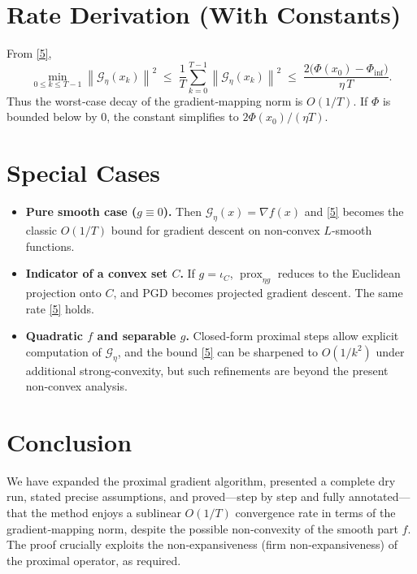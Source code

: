 \documentclass{article}
\newcommand{\prox}{\operatorname{prox}}
\newcommand{\norm}[1]{\left\|#1\right\|}
\newcommand{\grad}{\nabla}
\newcommand{\G}{\mathcal{G}}
\begin{document}
\section*{Rate Derivation (With Constants)}
From \eqref{5},
\[
\min_{0\le k\le T-1}\norm{\G_{\eta}(x_{k})}^{2}
\;\le\;
\frac{1}{T}\sum_{k=0}^{T-1}\norm{\G_{\eta}(x_{k})}^{2}
\;\le\;
\frac{2\big(\Phi(x_{0})-\Phi_{\inf}\big)}{\eta\,T}.
\]
Thus the worst‑case decay of the gradient‑mapping norm is $O(1/T)$.
If $\Phi$ is bounded below by $0$, the constant simplifies to $2\Phi(x_{0})/(\eta T)$.

\section*{Special Cases}
\begin{itemize}
\item \textbf{Pure smooth case ($g\equiv0$).} Then $\G_{\eta}(x)=\grad f(x)$ and \eqref{5} becomes the classic $O(1/T)$ bound for gradient descent on non‑convex $L$‑smooth functions.
\item \textbf{Indicator of a convex set $C$.} If $g=\iota_{C}$, $\prox_{\eta g}$ reduces to the Euclidean projection onto $C$, and PGD becomes projected gradient descent. The same rate \eqref{5} holds.
\item \textbf{Quadratic $f$ and separable $g$.} Closed‑form proximal steps allow explicit computation of $\G_{\eta}$, and the bound \eqref{5} can be sharpened to $O(1/k^{2})$ under additional strong‑convexity, but such refinements are beyond the present non‑convex analysis.
\end{itemize}

\section*{Conclusion}
We have expanded the proximal gradient algorithm, presented a complete dry run, stated precise assumptions, and proved—step by step and fully annotated—that the method enjoys a sublinear $O(1/T)$ convergence rate in terms of the gradient‑mapping norm, despite the possible non‑convexity of the smooth part $f$. The proof crucially exploits the non‑expansiveness (firm non‑expansiveness) of the proximal operator, as required.
\end{document}
